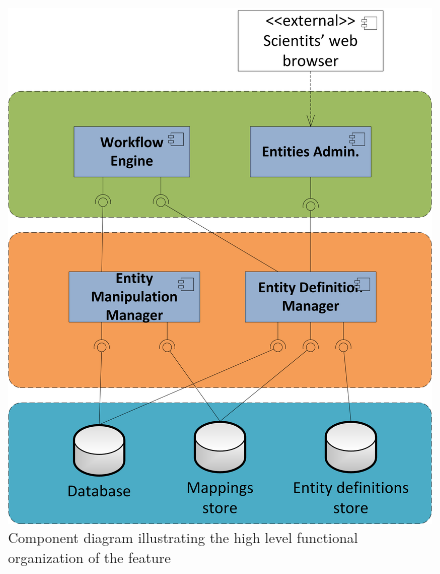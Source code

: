 \begin{figure}[h!]
  \centering
  	\includegraphics[scale=0.75]{storage/functional/func_main.png}
  \caption{Component diagram illustrating the high level functional organization of the feature }
  \label{fig:storageFuncMain}
\end{figure}

